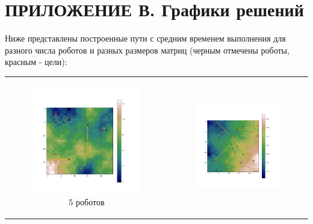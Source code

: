 \documentclass{article}
\begin{document}
	\section*{ПРИЛОЖЕНИЕ В. Графики решений} \label{sec:png}
	Ниже представлены построенные пути с средним временем выполнения для разного числа роботов и разных размеров матриц (черным отмечены роботы, красным - цели):
	\begin{table}[H]
		\begin{tabular}{c c}
			\begin{subfigure}{0.5\linewidth}
				\includegraphics[width = 1.0\columnwidth]{data/mean_paths/25x25/5.png}
			\caption*{5 роботов}
			\end{subfigure}
			&
			\begin{subfigure}{0.5\linewidth}
				\includegraphics[width = 1.0\columnwidth]{data/mean_paths/25x25/10.png}

\end{subfigure}
\end{tabular}
\end{table}
\end{document}
